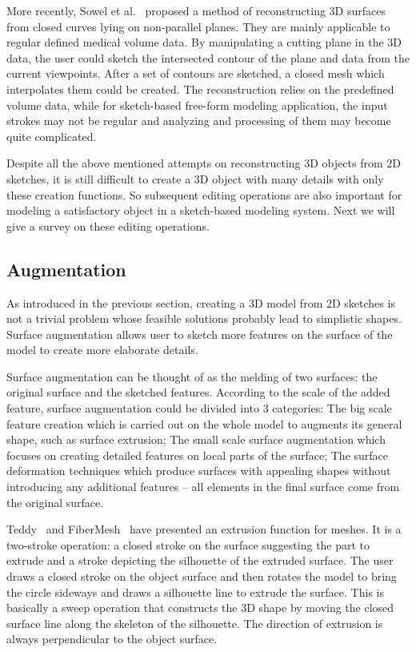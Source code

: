 More recently, Sowel et al.~\cite{SLJGAGL09} proposed a method of reconstructing 3D surfaces from closed curves lying on non-parallel planes. They are mainly applicable to regular defined medical volume data. By manipulating a cutting plane in the 3D data, the user could sketch the intersected contour of the plane and data from the current viewpoints. After a set of contours are sketched, a closed mesh which interpolates them could be created. The reconstruction relies on the predefined volume data, while for sketch-based free-form modeling application, the input strokes may not be regular and analyzing and processing of them may become quite complicated.

Despite all the above mentioned attempts on reconstructing 3D objects from 2D sketches, it is still difficult to create a 3D object with many details with only these creation functions. So subsequent editing operations are also important for modeling a satisfactory object in a sketch-based modeling system. Next we will give a survey on these editing operations.

\subsection{Augmentation}\label{ch2:sec:sbim:augmentation}

As introduced in the previous section, creating a 3D model from 2D sketches is not a trivial problem whose feasible solutions probably lead to simplistic shapes. Surface augmentation allows user to sketch more features on the surface of the model to create more elaborate details.

Surface augmentation can be thought of as the melding of two surfaces: the original surface and the sketched features. According to the scale of the added feature, surface augmentation could be divided into 3 categories: The big scale feature creation which is carried out on the whole model to augments its general shape, such as surface extrusion; The small scale surface augmentation which focuses on creating detailed features on local parts of the surface; The surface deformation techniques which produce surfaces with appealing shapes without introducing any additional features -- all elements in the final surface come from the original surface.

Teddy~\cite{IMT99} and FiberMesh~\cite{NISA07} have presented an extrusion function for meshes. It is a two-stroke operation: a closed stroke on the surface suggesting the part to extrude and a stroke depicting the silhouette of the extruded surface. The user draws a closed stroke on the object surface and then rotates the model to bring the circle sideways and draws a silhouette line to extrude the surface. This is basically a sweep operation that constructs the 3D shape by moving the closed surface line along the skeleton of the silhouette. The direction of extrusion is always perpendicular to the object surface.

